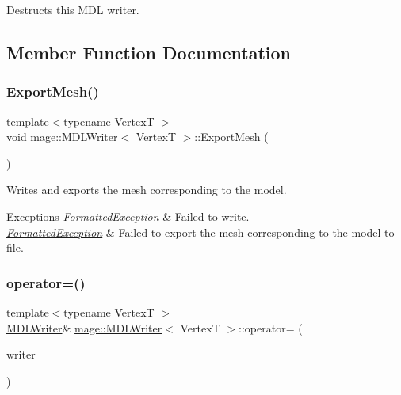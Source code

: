 Destructs this M\+DL writer. 

\subsection{Member Function Documentation}
\hypertarget{classmage_1_1_m_d_l_writer_af3f41c26153fe3d22b6a4d62140ca113}{}\label{classmage_1_1_m_d_l_writer_af3f41c26153fe3d22b6a4d62140ca113} 
\subsubsection{\texorpdfstring{Export\+Mesh()}{ExportMesh()}}
{\footnotesize\ttfamily template$<$typename VertexT $>$ \\
void \hyperlink{classmage_1_1_m_d_l_writer}{mage\+::\+M\+D\+L\+Writer}$<$ VertexT $>$\+::Export\+Mesh (\begin{DoxyParamCaption}{ }\end{DoxyParamCaption})\hspace{0.3cm}{\ttfamily [private]}}

Writes and exports the mesh corresponding to the model.


\begin{DoxyExceptions}{Exceptions}
{\em \hyperlink{structmage_1_1_formatted_exception}{Formatted\+Exception}} & Failed to write. \\
\hline
{\em \hyperlink{structmage_1_1_formatted_exception}{Formatted\+Exception}} & Failed to export the mesh corresponding to the model to file. \\
\hline
\end{DoxyExceptions}
\hypertarget{classmage_1_1_m_d_l_writer_ac8f4db1bc43a8fe4842409671505b49b}{}\label{classmage_1_1_m_d_l_writer_ac8f4db1bc43a8fe4842409671505b49b} 
\subsubsection{\texorpdfstring{operator=()}{operator=()}\hspace{0.1cm}{\footnotesize\ttfamily [1/2]}}
{\footnotesize\ttfamily template$<$typename VertexT $>$ \\
\hyperlink{classmage_1_1_m_d_l_writer}{M\+D\+L\+Writer}\& \hyperlink{classmage_1_1_m_d_l_writer}{mage\+::\+M\+D\+L\+Writer}$<$ VertexT $>$\+::operator= (\begin{DoxyParamCaption}\item[{const \hyperlink{classmage_1_1_m_d_l_writer}{M\+D\+L\+Writer}$<$ VertexT $>$ \&}]{writer }\end{DoxyParamCaption})\hspace{0.3cm}{\ttfamily [delete]}}

